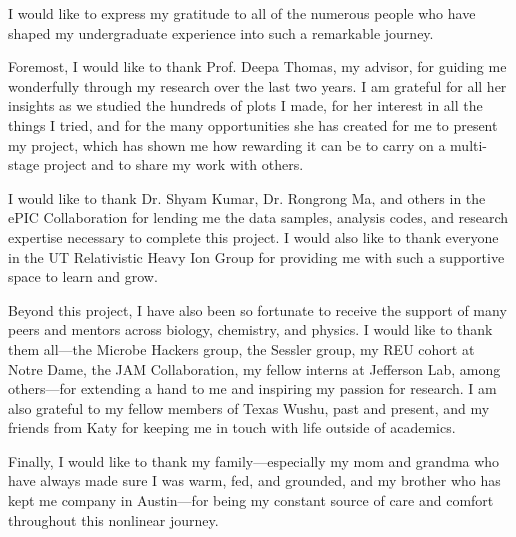 \begin{acknowledgments}		%
I would like to express my gratitude to all of the numerous people who have shaped my undergraduate experience into such a remarkable journey.

Foremost, I would like to thank Prof. Deepa Thomas, my advisor, for guiding me wonderfully through my research over the last two years. I am grateful for all her insights as we studied the hundreds of plots I made, for her interest in all the things I tried, and for the many opportunities she has created for me to present my project,
which has shown me how rewarding it can be to carry on a multi-stage project and to share my work with others.

I would like to thank Dr. Shyam Kumar, Dr. Rongrong Ma, and others in the ePIC Collaboration for lending me the data samples, analysis codes, and research expertise necessary to complete this project. I would also like to thank everyone in the UT Relativistic Heavy Ion Group for providing me with such a supportive space to learn and grow.

Beyond this project, I have also been so fortunate to receive the support of many peers and mentors across biology, chemistry, and physics. I would like to thank them all---the Microbe Hackers group, the Sessler group, my REU cohort at Notre Dame, the JAM Collaboration, my fellow interns at Jefferson Lab, among others---for extending a hand to me and inspiring my passion for research. I am also grateful to my fellow members of Texas Wushu, past and present, and my friends from Katy for keeping me in touch with life outside of academics.

Finally, I would like to thank my family---especially my mom and grandma who have always made sure I was warm, fed, and grounded, and my brother who has kept me company in Austin---for being my constant source of care and comfort throughout this nonlinear journey.



\end{acknowledgments}



